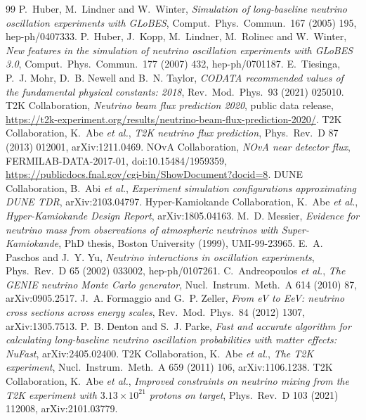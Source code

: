 \documentclass[11pt,a4paper]{article}
\begin{document}
\begin{thebibliography}{99}
 P.~Huber, M.~Lindner and W.~Winter, \emph{Simulation of long-baseline neutrino oscillation experiments with GLoBES}, Comput.\ Phys.\ Commun.\ 167 (2005) 195, hep-ph/0407333.
 P.~Huber, J.~Kopp, M.~Lindner, M.~Rolinec and W.~Winter, \emph{New features in the simulation of neutrino oscillation experiments with GLoBES 3.0}, Comput.\ Phys.\ Commun.\ 177 (2007) 432, hep-ph/0701187.
 E.~Tiesinga, P.~J. Mohr, D.~B. Newell and B.~N. Taylor, \emph{CODATA recommended values of the fundamental physical constants: 2018}, Rev.\ Mod.\ Phys.\ 93 (2021) 025010.
 T2K Collaboration, \emph{Neutrino beam flux prediction 2020}, public data release, \url{https://t2k-experiment.org/results/neutrino-beam-flux-prediction-2020/}.
 T2K Collaboration, K.~Abe \emph{et al.}, \emph{T2K neutrino flux prediction}, Phys.\ Rev.\ D 87 (2013) 012001, arXiv:1211.0469.
 NOvA Collaboration, \emph{NOvA near detector flux}, FERMILAB-DATA-2017-01, doi:10.15484/1959359, \url{https://publicdocs.fnal.gov/cgi-bin/ShowDocument?docid=8}.
 DUNE Collaboration, B.~Abi \emph{et al.}, \emph{Experiment simulation configurations approximating DUNE TDR}, arXiv:2103.04797.
 Hyper-Kamiokande Collaboration, K.~Abe \emph{et al.}, \emph{Hyper-Kamiokande Design Report}, arXiv:1805.04163.
 M.~D. Messier, \emph{Evidence for neutrino mass from observations of atmospheric neutrinos with Super-Kamiokande}, PhD thesis, Boston University (1999), UMI-99-23965.
 E.~A. Paschos and J.~Y. Yu, \emph{Neutrino interactions in oscillation experiments}, Phys.\ Rev.\ D 65 (2002) 033002, hep-ph/0107261.
 C.~Andreopoulos \emph{et al.}, \emph{The GENIE neutrino Monte Carlo generator}, Nucl.\ Instrum.\ Meth.\ A 614 (2010) 87, arXiv:0905.2517.
 J.~A. Formaggio and G.~P. Zeller, \emph{From eV to EeV: neutrino cross sections across energy scales}, Rev.\ Mod.\ Phys.\ 84 (2012) 1307, arXiv:1305.7513.
 P.~B. Denton and S.~J. Parke, \emph{Fast and accurate algorithm for calculating long-baseline neutrino oscillation probabilities with matter effects: NuFast}, arXiv:2405.02400.
 T2K Collaboration, K.~Abe \emph{et al.}, \emph{The T2K experiment}, Nucl.\ Instrum.\ Meth.\ A 659 (2011) 106, arXiv:1106.1238.
 T2K Collaboration, K.~Abe \emph{et al.}, \emph{Improved constraints on neutrino mixing from the T2K experiment with $3.13\times10^{21}$ protons on target}, Phys.\ Rev.\ D 103 (2021) 112008, arXiv:2101.03779.

\end{thebibliography}
\end{document}
